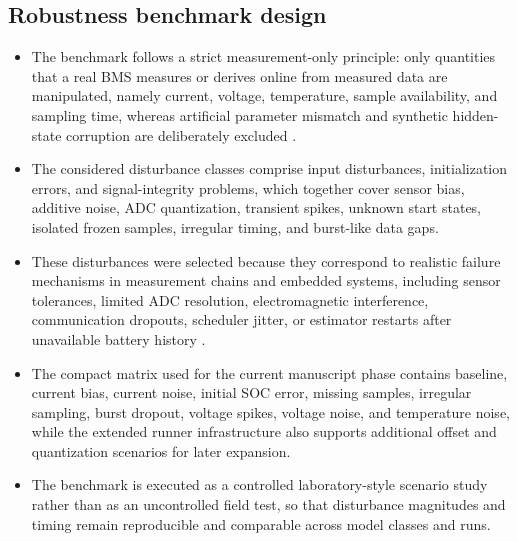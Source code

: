 \documentclass[review,nopreprintline]{elsarticle}
\begin{document}
\subsection{Robustness benchmark design}
\begin{itemize}[leftmargin=*]
    \item The benchmark follows a strict measurement-only principle: only quantities that a real BMS measures or derives online from measured data are manipulated, namely current, voltage, temperature, sample availability, and sampling time, whereas artificial parameter mismatch and synthetic hidden-state corruption are deliberately excluded \cite{bergerBenchmarkingBatteryManagement2024}.
    \item The considered disturbance classes comprise input disturbances, initialization errors, and signal-integrity problems, which together cover sensor bias, additive noise, ADC quantization, transient spikes, unknown start states, isolated frozen samples, irregular timing, and burst-like data gaps.
    \item These disturbances were selected because they correspond to realistic failure mechanisms in measurement chains and embedded systems, including sensor tolerances, limited ADC resolution, electromagnetic interference, communication dropouts, scheduler jitter, or estimator restarts after unavailable battery history \cite{liRobustnessSOCEstimation2015,naseriReliableWirelessBMS2025,bergerBenchmarkingBatteryManagement2024}.
    \item The compact matrix used for the current manuscript phase contains baseline, current bias, current noise, initial SOC error, missing samples, irregular sampling, burst dropout, voltage spikes, voltage noise, and temperature noise, while the extended runner infrastructure also supports additional offset and quantization scenarios for later expansion.
    \item The benchmark is executed as a controlled laboratory-style scenario study rather than as an uncontrolled field test, so that disturbance magnitudes and timing remain reproducible and comparable across model classes and runs.
\end{itemize}
\end{document}
